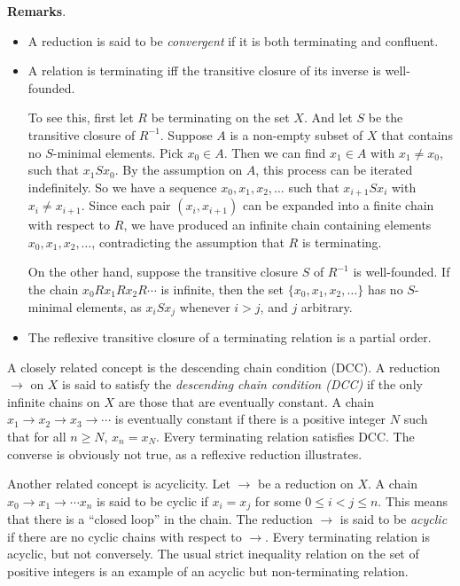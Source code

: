 \documentclass[12pt]{article}
\begin{document}
\textbf{Remarks}.  
\begin{itemize}
\item
A reduction is said to be \emph{convergent} if it is both terminating and confluent.
\item
A relation is terminating iff the transitive closure of its inverse is well-founded.  

To see this, first let $R$ be terminating on the set $X$.  And let $S$ be the transitive closure of $R^{-1}$.  Suppose $A$ is a non-empty subset of $X$ that contains no $S$-minimal elements.  Pick $x_0 \in A$.   Then we can find $x_1\in A$ with $x_1\ne x_0$, such that $x_1 S x_0$.  By the assumption on $A$, this process can be iterated indefinitely.  So we have a sequence $x_0, x_1, x_2, \ldots$ such that $x_{i+1} S x_i$ with $x_i\ne x_{i+1}$.  Since each pair $(x_i,x_{i+1})$ can be expanded into a finite chain with respect to $R$, we have produced an infinite chain containing elements $x_0, x_1, x_2, \ldots$, contradicting the assumption that $R$ is terminating.  

On the other hand, suppose the transitive closure $S$ of $R^{-1}$ is well-founded.  If the chain $x_0 R x_1 R x_2 R \cdots$ is infinite, then the set $\lbrace x_0, x_1, x_2, \ldots \rbrace$ has no $S$-minimal elements, as $x_i S x_j$ whenever $i>j$, and $j$ arbitrary.
\item
The reflexive transitive closure of a terminating relation is a partial order.
\end{itemize}

A closely related concept is the descending chain condition (DCC).  A reduction $\to$ on $X$ is said to satisfy the \emph{descending chain condition (DCC)} if the only infinite chains on $X$ are those that are eventually constant.  A chain $x_1\to x_2 \to x_3 \to \cdots $ is eventually constant if there is a positive integer $N$ such that for all $n\ge N$, $x_n=x_N$.  Every terminating relation satisfies DCC.  The converse is obviously not true, as a reflexive reduction illustrates.

Another related concept is acyclicity.  Let $\to$ be a reduction on $X$.  A chain $x_0\to x_1 \to \cdots x_n$ is said to be cyclic if $x_i=x_j$ for some $0\le i < j\le n$.  This means that there is a ``closed loop'' in the chain.  The reduction $\to$ is said to be \emph{acyclic} if there are no cyclic chains with respect to $\to$.  Every terminating relation is acyclic, but not conversely.  The usual strict inequality relation on the set of positive integers is an example of an acyclic but non-terminating relation.
\end{document}
